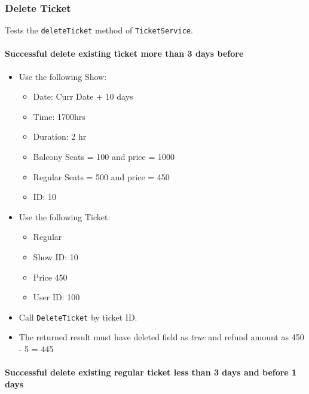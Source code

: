 \documentclass[]{article}
\providecommand{\tightlist}{%
  \setlength{\itemsep}{0pt}\setlength{\parskip}{0pt}}
\let\oldparagraph\paragraph
\renewcommand{\paragraph}[1]{\oldparagraph{#1}\mbox{}}
\begin{document}
\hypertarget{delete-ticket}{%
\subsubsection{Delete Ticket}\label{delete-ticket}}

Tests the \texttt{deleteTicket} method of \texttt{TicketService}.

\hypertarget{successful-delete-existing-ticket-more-than-3-days-before}{%
\paragraph{Successful delete existing ticket more than 3 days
before}\label{successful-delete-existing-ticket-more-than-3-days-before}}

\begin{itemize}
\tightlist
\item
  Use the following Show:

  \begin{itemize}
  \tightlist
  \item
    Date: Curr Date + 10 days
  \item
    Time: 1700hrs
  \item
    Duration: 2 hr
  \item
    Balcony Seats = 100 and price = 1000
  \item
    Regular Seats = 500 and price = 450
  \item
    ID: 10
  \end{itemize}
\item
  Use the following Ticket:

  \begin{itemize}
  \tightlist
  \item
    Regular
  \item
    Show ID: 10
  \item
    Price 450
  \item
    User ID: 100
  \end{itemize}
\item
  Call \texttt{DeleteTicket} by ticket ID.
\item
  The returned result must have deleted field as \emph{true} and refund
  amount as 450 - 5 = 445
\end{itemize}

\hypertarget{successful-delete-existing-regular-ticket-less-than-3-days-and-before-1-days}{%
\paragraph{Successful delete existing regular ticket less than 3 days
and before 1
days}\label{successful-delete-existing-regular-ticket-less-than-3-days-and-before-1-days}}
\end{document}
